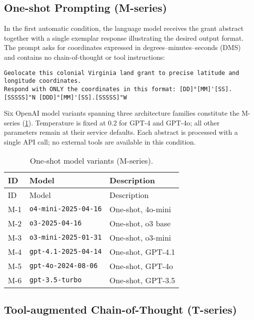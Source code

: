 \subsection{One-shot Prompting
(M-series)}\label{one-shot-prompting-m-series}

In the first automatic condition, the language model receives the grant
abstract together with a single exemplar response illustrating the
desired output format. The prompt asks for coordinates expressed in
degrees--minutes--seconds (DMS) and contains no chain-of-thought or tool
instructions:

\begin{lstlisting}
Geolocate this colonial Virginia land grant to precise latitude and longitude coordinates.
Respond with ONLY the coordinates in this format: [DD]°[MM]'[SS].[SSSSS]"N [DDD]°[MM]'[SS].[SSSSS]"W
\end{lstlisting}

Six OpenAI model variants spanning three architecture families
constitute the M-series (\ref{tbl:mmodels}). Temperature is fixed at 0.2
for GPT-4 and GPT-4o; all other parameters remain at their service
defaults. Each abstract is processed with a single API call; no external
tools are available in this condition.

\begin{longtable}[]{@{}lll@{}}
\caption{\label{tbl:mmodels}One-shot model variants
(M-series).}\tabularnewline
\toprule\noalign{}
ID & Model & Description \\
\midrule\noalign{}
\endfirsthead
\toprule\noalign{}
ID & Model & Description \\
\midrule\noalign{}
\endhead
\bottomrule\noalign{}
\endlastfoot
M-1 & \passthrough{\lstinline!o4-mini-2025-04-16!} & One-shot,
4o-mini \\
M-2 & \passthrough{\lstinline!o3-2025-04-16!} & One-shot, o3 base \\
M-3 & \passthrough{\lstinline!o3-mini-2025-01-31!} & One-shot,
o3-mini \\
M-4 & \passthrough{\lstinline!gpt-4.1-2025-04-14!} & One-shot,
GPT-4.1 \\
M-5 & \passthrough{\lstinline!gpt-4o-2024-08-06!} & One-shot, GPT-4o \\
M-6 & \passthrough{\lstinline!gpt-3.5-turbo!} & One-shot, GPT-3.5 \\
\end{longtable}

\subsection{Tool-augmented Chain-of-Thought
(T-series)}\label{tool-augmented-chain-of-thought-t-series}

